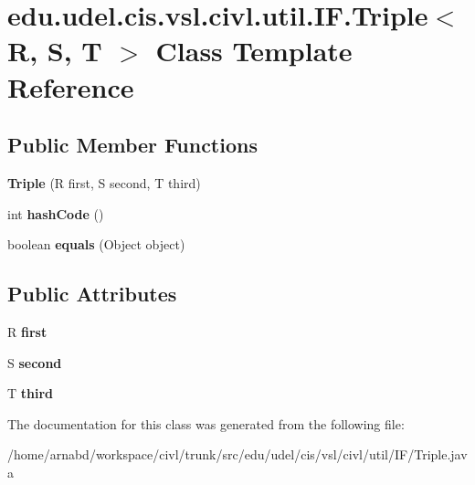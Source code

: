 \hypertarget{classedu_1_1udel_1_1cis_1_1vsl_1_1civl_1_1util_1_1IF_1_1Triple}{}\section{edu.\+udel.\+cis.\+vsl.\+civl.\+util.\+I\+F.\+Triple$<$ R, S, T $>$ Class Template Reference}
\label{classedu_1_1udel_1_1cis_1_1vsl_1_1civl_1_1util_1_1IF_1_1Triple}
\subsection*{Public Member Functions}
\begin{DoxyCompactItemize}
\item 
\hypertarget{classedu_1_1udel_1_1cis_1_1vsl_1_1civl_1_1util_1_1IF_1_1Triple_ad448c955fe19e151e847b979b4dfb3de}{}{\bfseries Triple} (R first, S second, T third)\label{classedu_1_1udel_1_1cis_1_1vsl_1_1civl_1_1util_1_1IF_1_1Triple_ad448c955fe19e151e847b979b4dfb3de}

\item 
\hypertarget{classedu_1_1udel_1_1cis_1_1vsl_1_1civl_1_1util_1_1IF_1_1Triple_a337fef158dac44e22cdaa0901a2800bc}{}int {\bfseries hash\+Code} ()\label{classedu_1_1udel_1_1cis_1_1vsl_1_1civl_1_1util_1_1IF_1_1Triple_a337fef158dac44e22cdaa0901a2800bc}

\item 
\hypertarget{classedu_1_1udel_1_1cis_1_1vsl_1_1civl_1_1util_1_1IF_1_1Triple_adefbd5ee894429620cddab99ad626817}{}boolean {\bfseries equals} (Object object)\label{classedu_1_1udel_1_1cis_1_1vsl_1_1civl_1_1util_1_1IF_1_1Triple_adefbd5ee894429620cddab99ad626817}

\end{DoxyCompactItemize}
\subsection*{Public Attributes}
\begin{DoxyCompactItemize}
\item 
\hypertarget{classedu_1_1udel_1_1cis_1_1vsl_1_1civl_1_1util_1_1IF_1_1Triple_ab39d044103abc50ea8abd1a586d5e3ad}{}R {\bfseries first}\label{classedu_1_1udel_1_1cis_1_1vsl_1_1civl_1_1util_1_1IF_1_1Triple_ab39d044103abc50ea8abd1a586d5e3ad}

\item 
\hypertarget{classedu_1_1udel_1_1cis_1_1vsl_1_1civl_1_1util_1_1IF_1_1Triple_a69157abc414e995f75eaddc642f58a1a}{}S {\bfseries second}\label{classedu_1_1udel_1_1cis_1_1vsl_1_1civl_1_1util_1_1IF_1_1Triple_a69157abc414e995f75eaddc642f58a1a}

\item 
\hypertarget{classedu_1_1udel_1_1cis_1_1vsl_1_1civl_1_1util_1_1IF_1_1Triple_a1e630ad36dbc7324f558e2043f06df21}{}T {\bfseries third}\label{classedu_1_1udel_1_1cis_1_1vsl_1_1civl_1_1util_1_1IF_1_1Triple_a1e630ad36dbc7324f558e2043f06df21}

\end{DoxyCompactItemize}


The documentation for this class was generated from the following file\+:\begin{DoxyCompactItemize}
\item 
/home/arnabd/workspace/civl/trunk/src/edu/udel/cis/vsl/civl/util/\+I\+F/Triple.\+java\end{DoxyCompactItemize}
